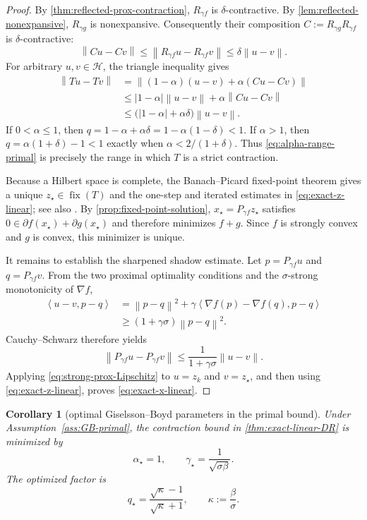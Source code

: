 \documentclass[10pt,leqno]{amsart}
\numberwithin{equation}{section}
\numberwithin{algorithm}{section}
\newtheorem{corollary}[theorem]{Corollary}
\theoremstyle{remark}
\newcommand{\Hcal}{\mathcal{H}}
\newcommand{\Fix}{\operatorname{fix}}
\newcommand{\subd}{\partial}
\newcommand{\norm}[1]{\left\lVert #1 \right\rVert}
\newcommand{\ip}[2]{\left\langle #1,#2 \right\rangle}
\newcommand{\grad}{\nabla}
\begin{document}
\begin{proof}
By \cref{thm:reflected-prox-contraction}, $R_{\gamma f}$ is
$\delta$-contractive.  By \cref{lem:reflected-nonexpansive},
$R_{\gamma g}$ is nonexpansive.  Consequently their composition
$C:=R_{\gamma g}R_{\gamma f}$ is $\delta$-contractive:
\[
  \norm{Cu-Cv}
  \le\norm{R_{\gamma f}u-R_{\gamma f}v}
  \le\delta\norm{u-v}.
\]
For arbitrary $u,v\in\Hcal$, the triangle inequality gives
\begin{align*}
  \norm{Tu-Tv}
  &=\norm{(1-\alpha)(u-v)+\alpha(Cu-Cv)}\\
  &\le |1-\alpha|\norm{u-v}
       +\alpha\norm{Cu-Cv}\\
  &\le\bigl(|1-\alpha|+\alpha\delta\bigr)\norm{u-v}.
\end{align*}
If $0<\alpha\le1$, then
$q=1-\alpha+\alpha\delta=1-\alpha(1-\delta)<1$.
If $\alpha>1$, then
$q=\alpha(1+\delta)-1<1$ exactly when
$\alpha<2/(1+\delta)$.  Thus \eqref{eq:alpha-range-primal} is precisely the range in which $T$ is a strict contraction.

Because a Hilbert space is complete, the Banach--Picard fixed-point theorem gives a unique $z_\star\in\Fix(T)$ and the one-step and iterated estimates in \eqref{eq:exact-z-linear}; see also \cite[Thm.~1.50]{BauschkeCombettes2017}.  By \cref{prop:fixed-point-solution},
$x_\star=P_{\gamma f}z_\star$ satisfies
$0\in\subd f(x_\star)+\subd g(x_\star)$ and therefore minimizes $f+g$.  Since $f$ is strongly convex and $g$ is convex, this minimizer is unique.

It remains to establish the sharpened shadow estimate.  Let
$p=P_{\gamma f}u$ and $q=P_{\gamma f}v$.  From the two proximal optimality conditions and the $\sigma$-strong monotonicity of $\grad f$,
\begin{align*}
  \ip{u-v}{p-q}
  &=\norm{p-q}^2
    +\gamma\ip{\grad f(p)-\grad f(q)}{p-q}\\
  &\ge(1+\gamma\sigma)\norm{p-q}^2.
\end{align*}
Cauchy--Schwarz therefore yields
\begin{equation}
\label{eq:strong-prox-Lipschitz}
  \norm{P_{\gamma f}u-P_{\gamma f}v}
  \le\frac{1}{1+\gamma\sigma}\norm{u-v}.
\end{equation}
Applying \eqref{eq:strong-prox-Lipschitz} to $u=z_k$ and $v=z_\star$, and then using \eqref{eq:exact-z-linear}, proves \eqref{eq:exact-x-linear}.
\end{proof}

\begin{corollary}[optimal Giselsson--Boyd parameters in the primal bound]
\label{cor:optimal-primal}
Under Assumption~\ref{ass:GB-primal}, the contraction bound in
\cref{thm:exact-linear-DR} is minimized by
\begin{equation}
\label{eq:gamma-alpha-opt-primal}
  \alpha_\star=1,
  \qquad
  \gamma_\star=\frac{1}{\sqrt{\sigma\beta}}.
\end{equation}
The optimized factor is
\begin{equation}
\label{eq:optimal-factor-primal}
  q_\star
  =\frac{\sqrt{\kappa}-1}{\sqrt{\kappa}+1},
  \qquad
  \kappa:=\frac{\beta}{\sigma}.
\end{equation}
\end{corollary}
\end{document}
